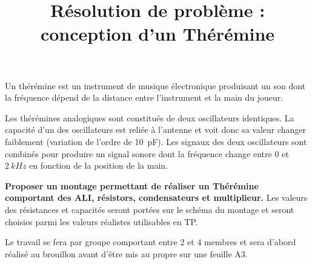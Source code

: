\documentclass[12pt,a5paper]{article}
\title{Résolution de problème : conception d'un Thérémine}
\date{}
\begin{document}
\maketitle

Un thérémine est un instrument de musique électronique produisant un son dont la fréquence dépend de la distance entre l'instrument et la main du joueur.

Les thérémines analogiques sont constitués de deux oscillateurs identiques. La capacité d'un des oscillateurs est reliée à l'antenne et voit donc sa valeur changer faiblement (variation de l'ordre de \SI{10}{pF}). Les signaux des deux oscillateurs sont combinés pour produire un signal sonore dont la fréquence change entre $0$ et $\SI{2}{kHz}$ en fonction de la position de la main.

\textbf{Proposer un montage permettant de réaliser un Thérémine comportant des ALI, résistors, condensateurs et multiplieur.} Les valeurs des résistances et capacités seront portées sur le schéma du montage et seront choisies parmi les valeurs réalistes utilisables en TP.

Le travail se fera par groupe comportant entre 2 et 4 membres et sera d'abord réalisé au brouillon avant d'être mis au propre sur une feuille A3.
\end{document}
